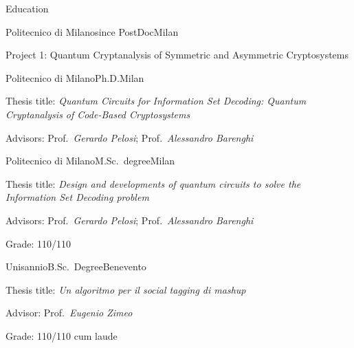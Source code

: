 \documentclass[
	a4paper, %
	10pt, %
]{tresume} %
\begin{document}
\begin{tSection}{Education}
  \begin{tSubsection}{Politecnico di Milano}{since }{PostDoc}{Milan}
  \item Project 1: Quantum Cryptanalysis of Symmetric and Asymmetric Cryptosystems
  \end{tSubsection}
  \begin{tSubsection}{Politecnico di Milano}{}{Ph.D.}{Milan}
  \item Thesis title: \emph{Quantum Circuits for Information Set Decoding: Quantum Cryptanalysis of Code-Based Cryptosystems}
  \item Advisors: Prof.\ \emph{Gerardo Pelosi}; Prof.\ \emph{Alessandro Barenghi}
  \end{tSubsection}
  \begin{tSubsection}{Politecnico di Milano}{}{M.Sc.\ degree}{Milan}
  \item Thesis title: \emph{Design and developments of quantum circuits to solve the Information Set Decoding problem}
  \item Advisors: Prof.\ \emph{Gerardo Pelosi}; Prof.\ \emph{Alessandro
      Barenghi}
  \item Grade: 110/110
  \end{tSubsection}
  \begin{tSubsection}{Unisannio}{}{B.Sc.\ Degree}{Benevento}
  \item Thesis title: \textit{Un algoritmo per il social tagging di mashup}
  \item Advisor: Prof.\ \emph{Eugenio Zimeo}
  \item Grade: 110/110 cum laude
  \end{tSubsection}
\end{tSection}
\end{document}
